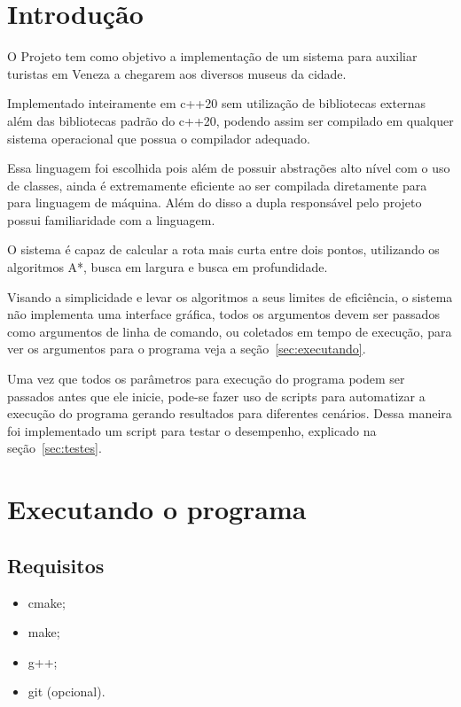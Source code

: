 \documentclass[12pt, a4paper]{article}
\begin{document}
\capa%
\tableofcontents%
\listoffigures%
\listoftables\cleardoublepage%

\section{Introdução}\label{sec:intro}
O Projeto tem como objetivo a implementação de um sistema para auxiliar turistas em Veneza a chegarem aos diversos museus da cidade.

Implementado inteiramente em c++20 sem utilização de bibliotecas externas além das bibliotecas padrão do c++20,
podendo assim ser compilado em qualquer sistema operacional que possua o compilador adequado.

Essa linguagem foi escolhida pois além de possuir abstrações alto nível com o uso de classes,
ainda é extremamente eficiente ao ser compilada diretamente para para linguagem de máquina.
Além do disso a dupla responsável pelo projeto possui familiaridade com a linguagem.

O sistema é capaz de calcular a rota mais curta entre dois pontos,
utilizando os algoritmos A*, busca em largura e busca em profundidade.

Visando a simplicidade e levar os algoritmos a seus limites de eficiência,
o sistema não implementa uma interface gráfica,
todos os argumentos devem ser passados como argumentos de linha de comando,
ou coletados em tempo de execução, para ver os argumentos para o programa veja a seção~\ref{sec:executando}.

Uma vez que todos os parâmetros para execução do programa podem ser passados antes que ele inicie,
pode-se fazer uso de scripts para automatizar a execução do programa gerando resultados para diferentes cenários.
Dessa maneira foi implementado um script para testar o desempenho, explicado na seção~\ref{sec:testes}.

\section{Executando o programa}\label{sec:executando_programa}
\subsection{Requisitos}\label{sec:requisitos}
\begin{itemize}
    \item cmake;
    \item make;
    \item g++;
    \item git (opcional).
\end{itemize}
\end{document}

